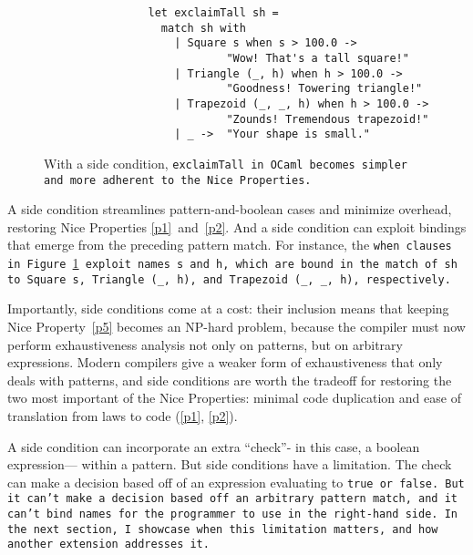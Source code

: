 \documentclass[manuscript,screen,review, 12pt, nonacm]{acmart}
\begin{document}
        \begin{figure}[]
            \begin{verbatim}
                let exclaimTall sh =
                  match sh with 
                    | Square s when s > 100.0 ->
                            "Wow! That's a tall square!"
                    | Triangle (_, h) when h > 100.0 ->
                            "Goodness! Towering triangle!"
                    | Trapezoid (_, _, h) when h > 100.0 -> 
                            "Zounds! Tremendous trapezoid!"
                    | _ ->  "Your shape is small." 
                \end{verbatim}
            \caption{With a side condition, \tt{exclaimTall} in OCaml becomes
            simpler and more adherent to the Nice Properties.} 
            \label{fig:whenexclaimtall}
        \end{figure}

    A side condition streamlines pattern-and-boolean cases and minimize
    overhead, restoring Nice Properties \ref{p1}~and~\ref{p2}. And a side
    condition can exploit bindings that emerge from the preceding pattern match.
    For instance, the \tt{when} clauses in Figure~\ref{fig:whenexclaimtall}
    exploit names \tt{s} and \tt{h}, which are bound in the match of \tt{sh} to
    \tt{Square s}, \tt{Triangle (\_, h)}, and \tt{Trapezoid (\_, \_, h)},
    respectively. 

    Importantly, side conditions come at a cost: their inclusion means that
    keeping Nice Property~\ref{p5} becomes an NP-hard problem, because the
    compiler must now perform exhaustiveness analysis not only on patterns, but
    on arbitrary expressions. Modern compilers give a weaker form of
    exhaustiveness that only deals with patterns, and side conditions are worth
    the tradeoff for restoring the two most important of the Nice Properties:
    minimal code duplication and ease of translation from laws to code
    (\ref{p1}, \ref{p2}).

    A side condition can incorporate an extra “check”- in this case, a boolean
    expression--- within a pattern. But side conditions have a limitation. The
    check can make a decision based off of an expression evaluating to \tt{true}
    or \tt{false}. But it can't make a decision based off an arbitrary pattern
    match, and it can't bind names for the programmer to use in the right-hand
    side. In the next section, I showcase when this limitation matters, and how
    another extension addresses it. 
\end{document}
